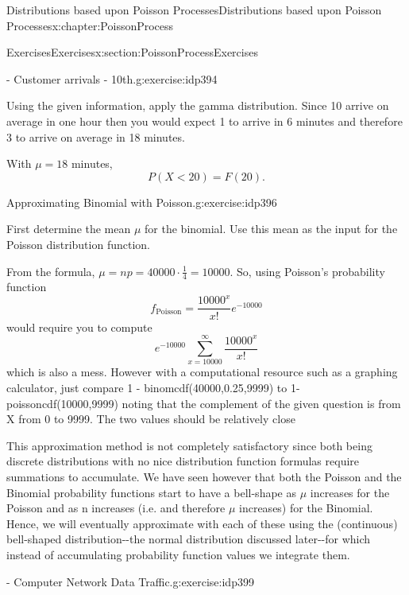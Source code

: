 \documentclass[oneside,10pt,]{book}
\numberwithin{equation}{section}
\newcommand{\lt}{<}
\begin{document}
\begin{chapterptx}{Distributions based upon Poisson Processes}{}{Distributions based upon Poisson Processes}{}{}{x:chapter:PoissonProcess}
\begin{sectionptx}{Exercises}{}{Exercises}{}{}{x:section:PoissonProcessExercises}
\begin{inlineexercise}{- Customer arrivals - 10th.}{g:exercise:idp394}
\begin{enumerate}
\end{enumerate}
%
\par\smallskip%
\noindent\hypertarget{g:solution:idp395}{}Using the given information, apply the gamma distribution.  Since 10 arrive on average in one hour then you would expect 1 to arrive in 6 minutes and therefore 3 to arrive on average in 18 minutes.%
\par
With \(\mu = 18\) minutes,%
\begin{equation*}
P(X \lt 20) = F(20).
\end{equation*}
%
\end{inlineexercise}%
\begin{inlineexercise}{Approximating Binomial with Poisson.}{g:exercise:idp396}%
\par\smallskip%
\noindent\hypertarget{g:hint:idp397}{}First determine the mean \(\mu\) for the binomial. Use this mean as the input for the Poisson distribution function.%
\par\smallskip%
\noindent\hypertarget{g:solution:idp398}{}From the formula, \(\mu = np = 40000 \cdot \frac{1}{4} = 10000\). So, using Poisson's probability function%
\begin{equation*}
f_{\text{Poisson}} = \frac{10000^{x}}{x!}e^{-10000}
\end{equation*}
would require you to compute%
\begin{equation*}
e^{-10000} \sum_{x=10000}^{\infty} \frac{10000^{x}}{x!}
\end{equation*}
which is also a mess. However with a computational resource such as a graphing calculator, just compare 1 - binomcdf(40000,0.25,9999) to 1-poissoncdf(10000,9999) noting that the complement of the given question is from X from 0 to 9999. The two values should be relatively close%
\par
This approximation method is not completely satisfactory since both being discrete distributions with no nice distribution function formulas require summations to accumulate. We have seen however that both the Poisson and the Binomial probability functions start to have a bell-shape as \(\mu\) increases for the Poisson and as n increases (i.e. and therefore \(\mu\) increases) for the Binomial. Hence, we will eventually approximate with each of these using the (continuous) bell-shaped distribution-{}-{}the normal distribution discussed later-{}-{}for which instead of accumulating probability function values we integrate them.%
\end{inlineexercise}%
\begin{inlineexercise}{- Computer Network Data Traffic.}{g:exercise:idp399}%

\end{inlineexercise}
\end{sectionptx}
\end{chapterptx}
\end{document}

